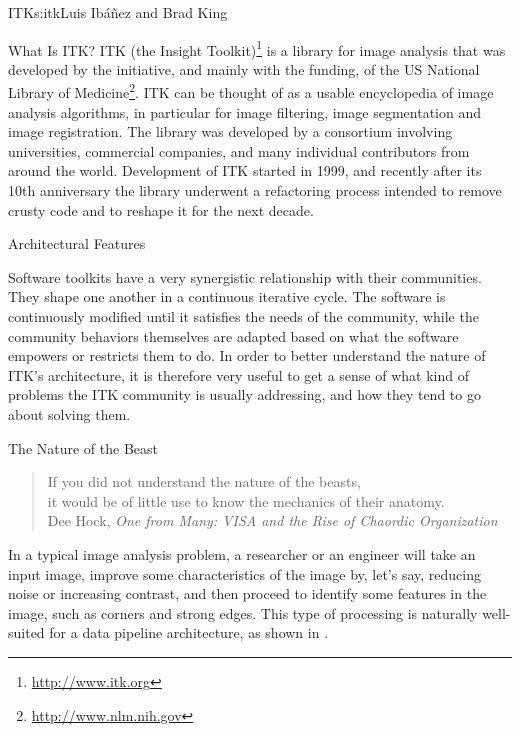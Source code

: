 \begin{aosachapter}{ITK}{s:itk}{Luis Ib\'{a}\~{n}ez and Brad King}


\begin{aosasect1}{What Is ITK?}
ITK (the Insight Toolkit)\footnote{\url{http://www.itk.org}} is a library for
image analysis that was developed by the initiative, and mainly with the
funding, of the US National Library of
Medicine\footnote{\url{http://www.nlm.nih.gov}}. ITK can be thought of as a
usable encyclopedia of image analysis algorithms, in particular for image
filtering, image segmentation and image registration. The library was developed
by a consortium involving universities, commercial companies, and many
individual contributors from around the world.  Development of ITK started in
1999, and recently after its 10th anniversary the library underwent a
refactoring process intended to remove crusty code and to reshape it for the
next decade.
\end{aosasect1}

\begin{aosasect1}{Architectural Features}

Software toolkits have a very synergistic relationship with their communities.
They shape one another in a continuous iterative cycle.  The software is continuously modified until it satisfies the needs of the community, while the community
behaviors themselves are adapted based on what the software empowers or
restricts them to do. In order to better understand the nature of ITK's
architecture, it is therefore very useful to get a sense of what kind of
problems the ITK community is usually addressing, and how they tend to go about
solving them.

\begin{aosasect2}{The Nature of the Beast}

\begin{center}
\begin{quotation}
If you did not understand the nature of the beasts,\\
it would be of little use to know the mechanics of their anatomy.\\
\hfill Dee Hock, \emph{One from Many: VISA and the Rise of Chaordic Organization}
\end{quotation}
\end{center}

In a typical image analysis problem, a researcher or an engineer will take an
input image, improve some characteristics of the image by, let's say,
reducing noise or increasing contrast, and then proceed to identify some
features in the image, such as corners and strong edges. This type of
processing is naturally well-suited for a data pipeline architecture, as
shown in .


\end{aosasect2}
\end{aosasect1}
\end{aosachapter}

